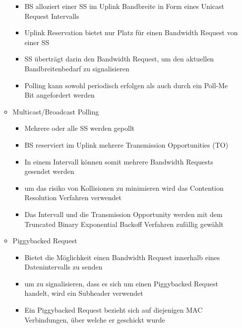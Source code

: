 \begin{itemize}
\begin{itemize}
\begin{itemize}
\item BS alloziert einer SS im Uplink Bandbreite in Form eines Unicast Request Intervalls
\item Uplink Reservation bietet nur Platz für einen Bandwidth Request von einer SS
\item SS überträgt darin den Bandwidth Request, um den aktuellen Bandbreitenbedarf zu signalisieren
\item Polling kann sowohl periodisch erfolgen als auch durch ein Poll-Me Bit angefordert werden
\end{itemize}
\item Multicast/Broadcast Polling
\begin{itemize}
\item Mehrere oder alle SS werden gepollt
\item BS reserviert im Uplink mehrere Transmission Opportunities (TO)
\item In einem Intervall können somit mehrere Bandwidth Requests gesendet werden
\item um das risiko von Kollisionen zu minimieren wird das Contention Resolution Verfahren verwendet
\item Das Intervall und die Transmission Opportunity werden mit dem Truncated Binary Exponential Backoff Verfahren zufällig gewählt
\end{itemize}
\item Piggybacked Request
\begin{itemize}
\item Bietet die Möglichkeit einen Bandwidth Request innerhalb eines Datenintervalls zu senden
\item um zu signalisieren, dass es sich um einen Piggybacked Request handelt, wird ein Subheader verwendet
\item Ein Piggybacked Request bezieht sich auf diejenigen MAC Verbindungen, über welche er geschickt wurde
\end{itemize}
\end{itemize}
\end{itemize}

